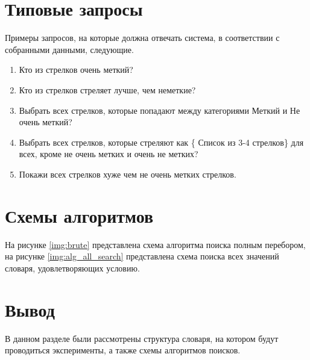 \section{Типовые запросы}
Примеры запросов, на которые должна отвечать система, в соответствии
с собранными данными, следующие.
\begin{enumerate}[ 1{)}]
  \item Кто из стрелков очень меткий?
  \item Кто из стрелков стреляет лучше, чем неметкие?
  \item Выбрать всех стрелков, которые попадают между категориями Меткий и Не очень меткий?
  \item Выбрать всех стрелков, которые стреляют как \{ Список из 3-4 стрелков\} для всех, кроме не очень метких и очень не метких?
  \item Покажи всех стрелков хуже чем не очень метких стрелков.
\end{enumerate}

\section{Схемы алгоритмов}

На рисунке \ref{img:brute} представлена схема алгоритма поиска полным перебором, на рисунке \ref{img:alg_all_search} представлена схема поиска всех значений словаря, удовлетворяющих условию.

\clearpage
{}
\clearpage

\section*{Вывод}

В данном разделе были рассмотрены структура словаря, на котором будут проводиться эксперименты, а также схемы алгоритмов поисков.
